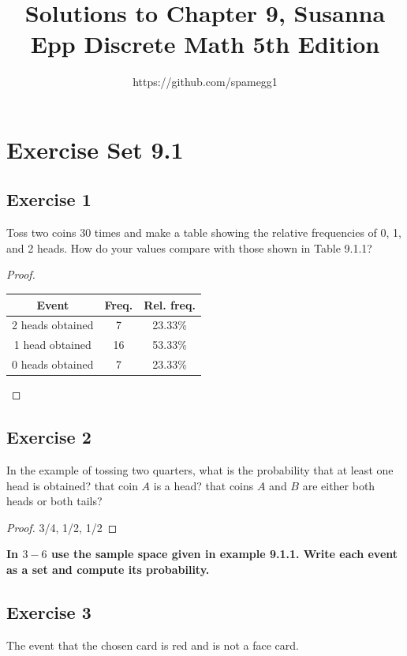 \documentclass[14pt]{extarticle}
\title{Solutions to Chapter 9, Susanna Epp Discrete Math 5th Edition}
\author{https://github.com/spamegg1}
\newcommand{\cy}{\color{cyan}}
\begin{document}
\maketitle
\tableofcontents

\section{Exercise Set 9.1}

\subsection{Exercise 1}
Toss two coins 30 times and make a table showing the relative frequencies of 0, 1, and 2 heads. How do your
values compare with those shown in Table 9.1.1?

\begin{proof}
     \begin{tabular}{|c|c|c|}
          \hline
          {\bf\cy Event}   & {\bf\cy Freq.} & {\bf\cy Rel. freq.} \\
          \hline
          2 heads obtained & 7              & 23.33\%             \\
          \hline
          1 head obtained  & 16             & 53.33\%             \\
          \hline
          0 heads obtained & 7              & 23.33\%             \\
          \hline
     \end{tabular}
\end{proof}

\subsection{Exercise 2}
In the example of tossing two quarters, what is the probability that at least one head is obtained? that coin
$A$ is a head? that coins $A$ and $B$ are either both
heads or both tails?

\begin{proof}
     3/4, 1/2, 1/2
\end{proof}

{\bf \cy In $3-6$ use the sample space given in example 9.1.1. Write each event as a set and compute its
probability.}

\subsection{Exercise 3}
The event that the chosen card is red and is not a face card.
\end{document}
